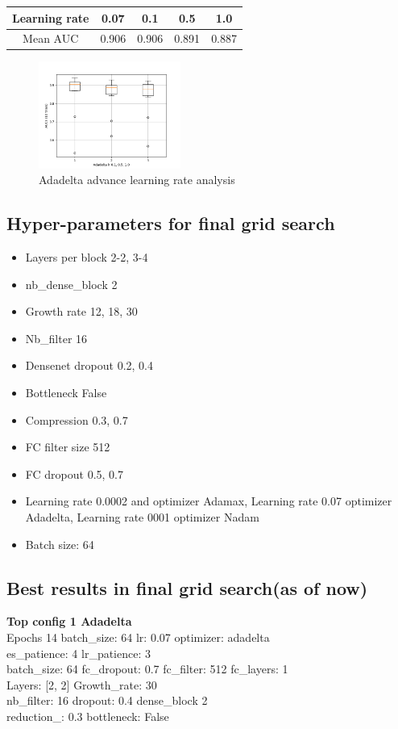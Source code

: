 \begin{center}
 \begin{tabular}{||c c c c c||} 
 \hline\hline
 Learning rate & 0.07 & 0.1 & 0.5 & 1.0 \\ [0.5ex] 
 \hline
 Mean AUC & 0.906 & 0.906 & 0.891 & 0.887 \\ 
 \hline
\end{tabular}
\end{center}

\begin{figure}[htp]
\centering
\includegraphics[height=3.5cm]{images/densenet/adadelta_highlr_analysis}
\caption{Adadelta advance learning rate analysis}
\label{fig:adadelta_highlr_analysis}
\end{figure}

\subsection{Hyper-parameters for final grid search}
\begin{itemize}
 \item Layers per block 2-2, 3-4
 \item nb\_dense\_block 2
 \item Growth rate 12, 18, 30
 \item Nb\_filter 16
 \item Densenet dropout 0.2, 0.4
 \item Bottleneck False
 \item Compression 0.3, 0.7
 \item FC filter size 512
 \item FC dropout 0.5, 0.7
 \item Learning rate 0.0002 and optimizer Adamax, Learning rate 0.07 optimizer Adadelta, Learning rate 0001 optimizer Nadam
 \item Batch size: 64
\end{itemize}

\subsection{Best results in final grid search(as of now)}
\textbf{Top config 1 Adadelta}\\
Epochs  14  batch\_size:  64  lr:  0.07  optimizer: adadelta \\
es\_patience:  4  lr\_patience:  3\\
batch\_size:  64  fc\_dropout:  0.7  fc\_filter:  512  fc\_layers:  1 \\
Layers:  [2, 2]  Growth\_rate:  30  \\
nb\_filter:  16  dropout:  0.4 dense\_block  2  \\
reduction\_:  0.3  bottleneck:  False \\


